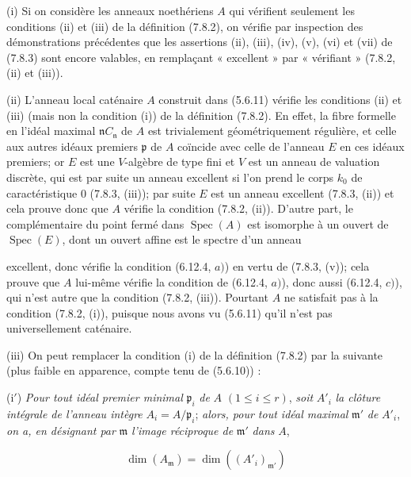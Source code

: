 \begin{remarks}[7.8.4]
\label{IV.2.s7.8.4-fr}
\upshape
(i) Si on considère les anneaux noethériens $A$ qui vérifient seulement les
conditions (ii) et (iii) de la définition (7.8.2), on vérifie par inspection
des démonstrations précédentes que les assertions (ii), (iii), (iv), (v), (vi)
et (vii) de (7.8.3) sont encore valables, en remplaçant « excellent » par
« vérifiant » (7.8.2, (ii) et (iii)).

(ii) L'anneau local caténaire $A$ construit dans (5.6.11) vérifie les
conditions (ii) et (iii) (mais non la condition (i)) de la définition (7.8.2).
En effet, la fibre formelle en l'idéal maximal $\mathfrak n C_{\mathfrak n}$ de
$A$ est trivialement géométriquement régulière, et celle aux autres idéaux
premiers $\mathfrak p$ de $A$ coïncide avec celle de l'anneau $E$ en ces idéaux
premiers; or $E$ est une $V$-algèbre de type fini et $V$ est un anneau de
valuation discrète, qui est par suite un anneau excellent si l'on prend le
corps $k_0$ de caractéristique $0$ (7.8.3, (iii)); par suite $E$ est un anneau
excellent (7.8.3, (ii)) et cela prouve donc que $A$ vérifie la condition (7.8.2,
(ii)). D'autre part, le complémentaire du point fermé dans
$\operatorname{Spec}(A)$ est isomorphe à un ouvert de $\operatorname{Spec}(E)$,
dont un ouvert affine est le spectre d'un anneau


excellent, donc vérifie la condition (6.12.4, $a)$) en vertu de (7.8.3, (v));
cela prouve que $A$ lui-même vérifie la condition de (6.12.4, $a)$), donc aussi
(6.12.4, $c)$), qui n'est autre que la condition (7.8.2, (iii)). Pourtant $A$
ne satisfait pas à la condition (7.8.2, (i)), puisque nous avons vu (5.6.11)
qu'il n'est pas universellement caténaire.

(iii) On peut remplacer la condition (i) de la définition (7.8.2) par la
suivante (plus faible en apparence, compte tenu de (5.6.10)) :

(i$'$) \emph{Pour tout idéal premier minimal} $\mathfrak p_i$ \emph{de} $A$
$(1\leq i\leq r)$, \emph{soit} $A'_i$ \emph{la clôture intégrale de l'anneau
intègre} $A_i=A/\mathfrak p_i$; \emph{alors, pour tout idéal maximal}
$\mathfrak m'$ \emph{de} $A'_i$, \emph{on a, en désignant par} $\mathfrak m$
\emph{l'image réciproque de} $\mathfrak m'$ \emph{dans} $A$,
\begin{env}[7.8.4.1]
\label{IV.2.s7.8.4.1-fr}
\[
\dim(A_{\mathfrak m})=\dim((A'_i)_{\mathfrak m'})
\]
\end{env}


\end{remarks}
